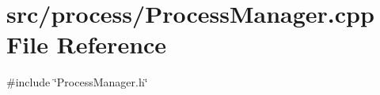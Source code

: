 \section{src/process/\+Process\+Manager.cpp File Reference}
\label{_process_manager_8cpp}
{\ttfamily \#include \char`\"{}Process\+Manager.\+h\char`\"{}}\newline
